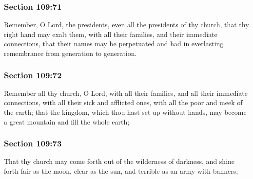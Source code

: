 	\subsubsection{Section 109:71} %
		\label{DC109-71}

		Remember, O Lord, the presidents, even all the presidents of thy church, that thy right hand may exalt them, with all their families, and their immediate connections, that their names may be perpetuated and had in everlasting remembrance from generation to generation.


	\subsubsection{Section 109:72} %
		\label{DC109-72}

		Remember all thy church, O Lord, with all their families, and all their immediate connections, with all their sick and afflicted ones, with all the poor and meek of the earth; that the kingdom, which thou hast set up without hands, may become a great mountain and fill the whole earth;


	\subsubsection{Section 109:73} %
		\label{DC109-73}

		That thy church may come forth out of the wilderness of darkness, and shine forth fair as the moon, clear as the sun, and terrible as an army with banners;

